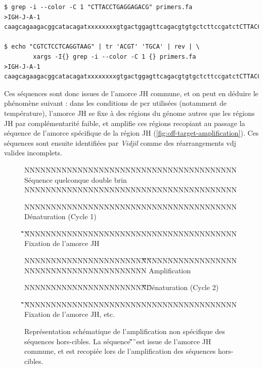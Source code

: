 \begin{lstlisting}[language=custombash, 
caption={Commande Bash et résultat de la recherche des séquences dans les amorces dégénérées.},
label={lst:bash-search-primer},
basicstyle=\ttfamily\scriptsize]
$ grep -i --color -C 1 "CTTACCTGAGGAGACG" primers.fa
>IGH-J-A-1
caagcagaagacggcatacagatxxxxxxxxgtgactggagttcagacgtgtgctcttccgatctCTTACCTGAGGAGACGgtgacc

$ echo "CGTCTCCTCAGGTAAG" | tr 'ACGT' 'TGCA' | rev | \
        xargs -I{} grep -i --color -C 1 {} primers.fa
>IGH-J-A-1
caagcagaagacggcatacagatxxxxxxxxgtgactggagttcagacgtgtgctcttccgatctCTTACCTGAGGAGACGgtgacc
\end{lstlisting}

\vspace{1em}

Ces séquences sont donc issues de l'amorce JH commune, et on peut en déduire le
phénomène suivant : dans les conditions de \gls{pcr} utilisées (notamment de
température), l'amorce JH se fixe à des régions du génome autres que les
régions JH par complémentarité faible, et amplifie ces régions recopiant au
passage la séquence de l'amorce spécifique de la région JH
(\autoref{fig:off-target-amplification}). Ces séquences sont ensuite
identifiées par \textit{Vidjil} comme des réarrangements \gls{vdj} valides
incomplets.

\begin{figure}[H]
    \centering
    \begin{ColoredVerbatim}

        NNNNNNNNNNNNNNNNNNNNNNNNNNNNNNNNNNNNNNNN Séquence quelconque double
        brin NNNNNNNNNNNNNNNNNNNNNNNNNNNNNNNNNNNNNNNN

        NNNNNNNNNNNNNNNNNNNNNNNNNNNNNNNNNNNNNNNN Dénaturation (Cycle 1)

        \C\G\T\C\T\C\C\T\C\A\G\G\T\A\A\G
        NNNNNNNNNNNNNNNNNNNNNNNNNNNNNNNNNNNNNNNN Fixation de l'amorce JH

        NNNNNNNNNNNNNNNNNNNNNNN\C\G\T\C\T\C\C\T\C\A\G\G\T\A\A\G
        NNNNNNNNNNNNNNNNNNNNNNNNNNNNNNNNNNNNNNNN Amplification

        NNNNNNNNNNNNNNNNNNNNNNN\C\G\T\C\T\C\C\T\C\A\G\G\T\A\A\G Dénaturation
        (Cycle 2)

        \C\G\T\C\T\C\C\T\C\A\G\G\T\A\A\G
        NNNNNNNNNNNNNNNNNNNNNNNNNNNNNNNNNNNNNNNN Fixation de l'amorce JH, etc.
    \end{ColoredVerbatim}
    \caption{
        Représentation schématique de l'amplification non spécifique des séquences hors-cibles.
        La séquence \C\G\T\C\T\C\C\T\C\A\G\G\T\A\A\G\ est issue de l'amorce JH commune, et est recopiée
        lors de l'amplification des séquences hors-cibles.
    }
    \label{fig:off-target-amplification}
\end{figure}

